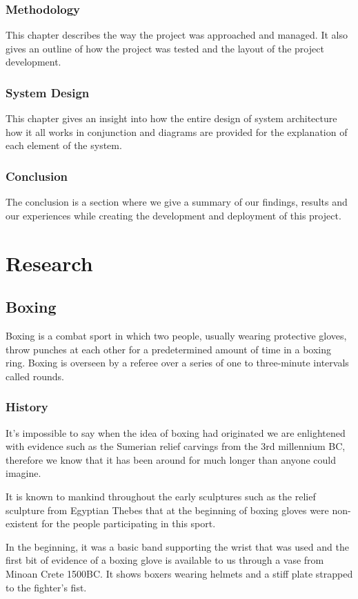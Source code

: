 \documentclass[a4paper,12pt]{report}
\begin{document}
\subsection{Methodology}
This chapter describes the way the project was approached and managed. It also gives an outline of how the project was tested and the layout of the project development.
\subsection{System Design}
This chapter gives an insight into how the entire design of system architecture how it all works in conjunction and diagrams are provided for the explanation of each element of the system. 
\subsection{Conclusion}
The conclusion is a section where we give a summary of our findings, results and our experiences while creating the development and deployment of this project.

\chapter{Research}
\section{Boxing}
Boxing is a combat sport in which two people, usually wearing protective gloves, throw punches at each other for a predetermined amount of time in a boxing ring. Boxing is overseen by a referee over a series of one to three-minute intervals called rounds.
\subsection{History}
It's impossible to say when the idea of boxing had originated we are enlightened with evidence such as the Sumerian relief carvings from the 3rd millennium BC, therefore we know that it has been around for much longer than anyone could imagine.

It is known to mankind throughout the early sculptures such as the relief sculpture from Egyptian Thebes that at the beginning of boxing gloves were non-existent for the people participating in this sport.

In the beginning, it was a basic band supporting the wrist that was used and the first bit of evidence of a boxing glove is available to us through a vase from Minoan Crete 1500BC. It shows boxers wearing helmets and a stiff plate strapped to the fighter's fist.\cite{Boxing}
\end{document}

